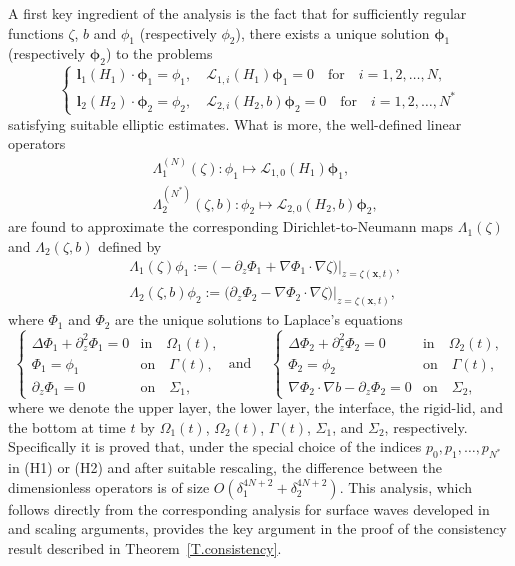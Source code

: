\documentclass[11pt,leqno]{article}
\numberwithin{equation}{section}
\numberwithin{figure}{section}
\begin{document}
A first key ingredient of the analysis is the fact that for sufficiently regular functions $\zeta$, $b$ and $\phi_1$ (respectively $\phi_2$), 
there exists a unique solution ${\bm \phi}_1$ (respectively ${\bm \phi}_2$) to the problems
\begin{equation}\label{intro:elliptic1}
	\begin{cases}
		\bm{l}_1(H_1)\cdot\bm{\phi}_1=\phi_1, \quad \mathcal{L}_{1,i}(H_1)\bm{\phi}_1=0
		\quad\mbox{for}\quad i=1,2,\ldots,N, \\
		\bm{l}_2(H_2)\cdot\bm{\phi}_2=\phi_2, \quad \mathcal{L}_{2,i}(H_2,b)\bm{\phi}_2=0
		\quad\mbox{for}\quad i=1,2,\ldots,N^*
	\end{cases}
\end{equation}
satisfying suitable elliptic estimates. What is more, the well-defined linear operators
\begin{align*}
	& \Lambda_1^{(N)}(\zeta) \colon \phi_1 \mapsto \mathcal{L}_{1,0}(H_1)\bm{\phi}_1, \\
	& \Lambda_2^{(N^*)}(\zeta,b) \colon \phi_2 \mapsto \mathcal{L}_{2,0}(H_2,b)\bm{\phi}_2, 
\end{align*}
are found to approximate the corresponding  Dirichlet-to-Neumann maps $\Lambda_1(\zeta)$ and $\Lambda_2(\zeta,b)$ 
defined by 
%
\begin{align*}
	&\Lambda_1(\zeta)\phi_1
	:= \bigl( -\partial_z\Phi_1+\nabla\Phi_1 \cdot \nabla\zeta \bigr)\bigr\vert_{z=\zeta(\bm{x},t)}, \\
	&\Lambda_2(\zeta,b)\phi_2
	:= \bigl( \partial_z\Phi_2-\nabla\Phi_2 \cdot \nabla\zeta \bigr)\bigr\vert_{z=\zeta(\bm{x},t)},
\end{align*}
%
where $\Phi_1$ and $\Phi_2$ are the unique solutions to  Laplace's equations
%
\[
\begin{cases}
	\Delta\Phi_1 + \partial_z^2\Phi_1 = 0 & \mbox{in}\quad \Omega_1(t), \\
	\Phi_1=\phi_1& \mbox{on}\quad \Gamma(t), \\
	\partial_z\Phi_1 = 0 & \mbox{on}\quad \Sigma_1, 
\end{cases}
%
\text{ and } \quad
%
\begin{cases}
	\Delta\Phi_2 + \partial_z^2\Phi_2 = 0 & \mbox{in}\quad \Omega_2(t), \\
	\Phi_2=\phi_2& \mbox{on}\quad \Gamma(t), \\
	\nabla\Phi_2 \cdot \nabla b - \partial_z\Phi_2 = 0
	& \mbox{on}\quad \Sigma_2,
\end{cases}
\]
%
where we denote the upper layer, the lower layer, the interface, the rigid-lid, 
and the bottom at time $t$ by $\Omega_1(t)$, $\Omega_2(t)$, $\Gamma(t)$, $\Sigma_1$, and $\Sigma_2$, respectively. 
Specifically it is proved that, under the special choice of the 
indices $p_0,p_1,\ldots,p_{N^*}$ in (H1) or (H2) and after suitable rescaling, 
the difference between the dimensionless operators is of size $O(\delta_1^{4N+2}+\delta_2^{4N+2})$.
This analysis, which follows directly from the corresponding analysis for surface waves developed in~\cite{Iguchi2018-2} and scaling arguments, 
provides the key argument in the proof of the consistency result described in Theorem~\ref{T.consistency}.
\end{document}
